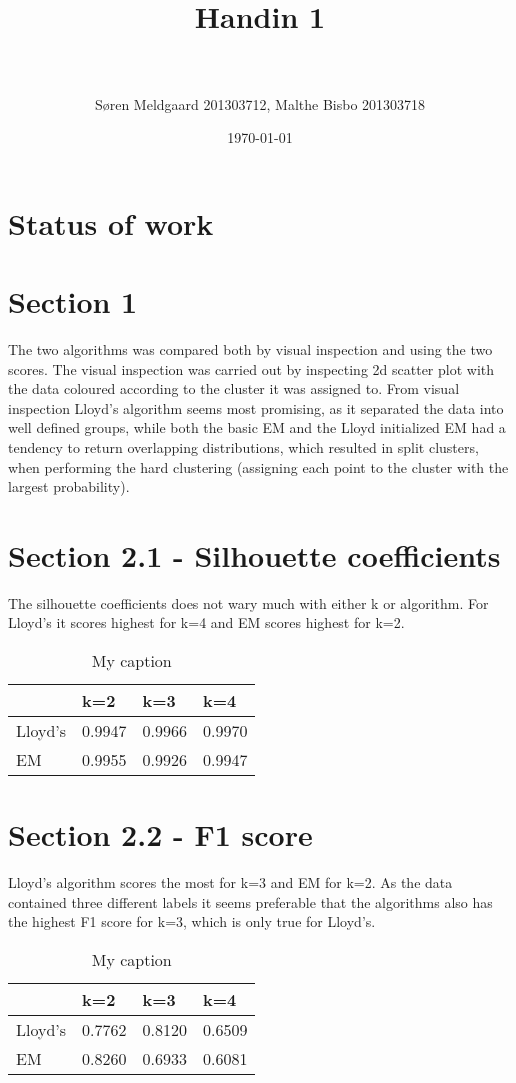 \documentclass[paper=a4, fontsize=11pt]{scrartcl} %
\title{	
\normalfont \normalsize 
\horrule{0.5pt} \\[0.4cm] %
\huge Handin 1 \\ %
\horrule{2pt} \\[0.5cm] %
}
\author{S\o ren Meldgaard 201303712, Malthe Bisbo 201303718} %
\date{\normalsize\today} %
\numberwithin{equation}{section} %
\numberwithin{figure}{section} %
\numberwithin{table}{section} %
\begin{document}
\maketitle %
\section*{Status of work}


\section*{Section 1}
The two algorithms was compared both by visual inspection and using the two scores. The visual inspection was carried out by inspecting 2d scatter plot with the data coloured according to the cluster it was assigned to. From visual inspection Lloyd's algorithm seems most promising, as it separated the data into well defined groups, while both the basic EM and the Lloyd initialized EM had a tendency to return overlapping distributions, which resulted in split clusters, when performing the hard clustering (assigning each point to the cluster with the largest probability).


\section*{Section 2.1 - Silhouette coefficients}
The silhouette coefficients does not wary much with either k or algorithm. For Lloyd's it scores highest for k=4 and EM scores highest for k=2.

\begin{table}[]
	\centering
	\caption{My caption}
	\label{my-label}
	\begin{tabular}{@{}llll@{}}
		\toprule
		& k=2    & k=3    & k=4    \\ \midrule
		Lloyd's & 0.9947 & 0.9966 & 0.9970 \\
		EM      & 0.9955 & 0.9926 & 0.9947
	\end{tabular}
\end{table}

\section*{Section 2.2 - F1 score}
Lloyd's algorithm scores the most for k=3 and EM for k=2. As the data contained three different labels it seems preferable that the algorithms also has the highest F1 score for k=3, which is only true for Lloyd's.

\begin{table}[]
	\centering
	\caption{My caption}
	\label{my-label}
	\begin{tabular}{@{}llll@{}}
		\toprule
		& k=2    & k=3    & k=4    \\ \midrule
		Lloyd's & 0.7762 & 0.8120 & 0.6509 \\
		EM      & 0.8260 & 0.6933 & 0.6081
	\end{tabular}
\end{table}
\end{document}
